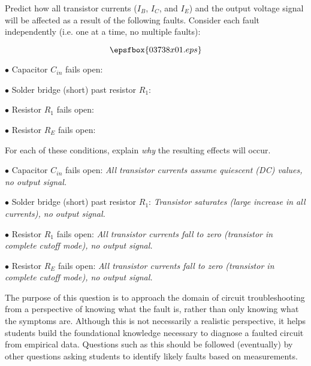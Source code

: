 

Predict how all transistor currents ($I_B$, $I_C$, and $I_E$) and the output voltage signal will be affected as a result of the following faults.  Consider each fault independently (i.e. one at a time, no multiple faults):

$$\epsfbox{03738x01.eps}$$

\medskip
\item{$\bullet$} Capacitor $C_{in}$ fails open:
\vskip 5pt
\item{$\bullet$} Solder bridge (short) past resistor $R_1$:
\vskip 5pt
\item{$\bullet$} Resistor $R_1$ fails open:
\vskip 5pt
\item{$\bullet$} Resistor $R_E$ fails open:
\medskip

For each of these conditions, explain {\it why} the resulting effects will occur.







\medskip
\item{$\bullet$} Capacitor $C_{in}$ fails open: {\it All transistor currents assume quiescent (DC) values, no output signal.}
\vskip 5pt
\item{$\bullet$} Solder bridge (short) past resistor $R_1$: {\it Transistor saturates (large increase in all currents), no output signal.}
\vskip 5pt
\item{$\bullet$} Resistor $R_1$ fails open: {\it All transistor currents fall to zero (transistor in complete cutoff mode), no output signal.}
\vskip 5pt
\item{$\bullet$} Resistor $R_E$ fails open: {\it All transistor currents fall to zero (transistor in complete cutoff mode), no output signal.}
\medskip







The purpose of this question is to approach the domain of circuit troubleshooting from a perspective of knowing what the fault is, rather than only knowing what the symptoms are.  Although this is not necessarily a realistic perspective, it helps students build the foundational knowledge necessary to diagnose a faulted circuit from empirical data.  Questions such as this should be followed (eventually) by other questions asking students to identify likely faults based on measurements.





